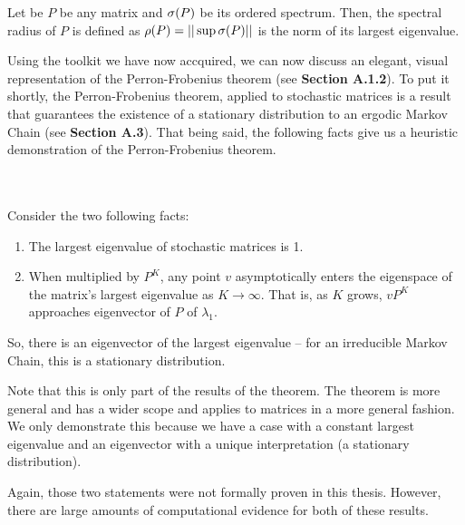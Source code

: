 \begin{definition}
  Let be $P$ be any matrix and $\sigma(P)$ be its ordered spectrum. Then, the spectral radius of $P$ is defined as $\rho(P) = ||\sup \sigma(P)||$ is the norm of its largest eigenvalue.
\end{definition}


Using the toolkit we have now accquired, we can now discuss an elegant, visual representation of the Perron-Frobenius theorem (see \textbf{Section A.1.2}).
To put it shortly, the Perron-Frobenius theorem, applied to stochastic matrices is a result that guarantees the existence of a stationary distribution to an ergodic Markov Chain (see \textbf{Section A.3}).
That being said, the following facts give us a heuristic demonstration of the Perron-Frobenius theorem.

\begin{theorem} \hfill
  \vspace{-1em}
  \\ \\ Consider the two following facts:
  \begin{enumerate}
    \item The largest eigenvalue of stochastic matrices is 1.
    \item When multiplied by $P^K$, any point $v$ asymptotically enters the eigenspace of the matrix's largest eigenvalue as $K \to \infty$. That is, as $K$ grows, $v P^K$ approaches eigenvector of $P$ of $\lambda_1$.
  \end{enumerate}
So, there is an eigenvector of the largest eigenvalue -- for an irreducible Markov Chain, this is a stationary distribution.
\end{theorem}

\begin{note}
  Note that this is only part of the results of the theorem. The theorem is more general and has a wider scope and applies to matrices in a more general fashion.
  We only demonstrate this because we have a case with a constant largest eigenvalue and an eigenvector with a unique interpretation (a stationary distribution).
\end{note}

\newpage

Again, those two statements were not formally proven in this thesis. However, there are large amounts of computational evidence for both of these results.

